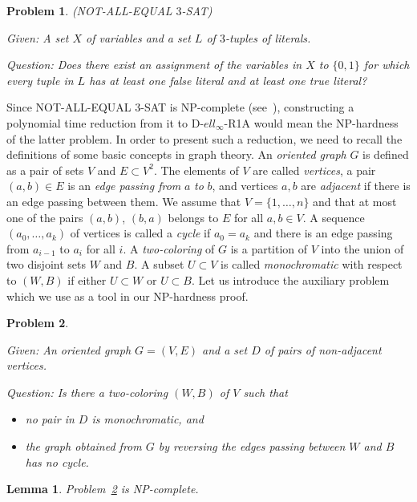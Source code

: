\documentclass[a4paper,11pt]{article}
\newtheorem{lemma}{Lemma}
\newtheorem{problem}{Problem}
\numberwithin{equation}{section}
\begin{document}
\begin{problem}\label{prob12} (NOT-ALL-EQUAL $3$-SAT) 

\noindent Given: A set $X$ of variables and a set $L$ of $3$-tuples of literals.

\noindent Question: Does there exist an assignment of the variables in $X$ to $\{0,1\}$ for which every tuple in $L$ has at least one false literal and at least one true literal? 
\end{problem} 

Since NOT-ALL-EQUAL $3$-SAT is NP-complete (see~\cite{Karp}), constructing a polynomial time reduction from it to D-$ell_\infty$-R1A would mean the NP-hardness of the latter problem. In order to present such a reduction, we need to recall the definitions of some basic concepts in graph theory. An \textit{oriented graph} $G$ is defined as a pair of sets $V$ and $E\subset V^2$. The elements of $V$ are called \textit{vertices}, a pair $(a,b)\in E$ is an \textit{edge passing from} $a$ \textit{to} $b$, and vertices $a,b$ are \textit{adjacent} if there is an edge passing between them. We assume that $V=\{1,\ldots,n\}$ and that at most one of the pairs $(a,b)$, $(b,a)$ belongs to $E$ for all $a,b \in V$. 
A sequence $(a_0,\ldots,a_k)$ of vertices is called a \textit{cycle} if $a_0=a_k$ and there is an edge passing from $a_{i-1}$ to $a_i$ for all $i$. 
A \textit{two-coloring} of $G$ is a partition of $V$ into the union of two disjoint sets $W$ and $B$. A subset $U\subset V$ is called \textit{monochromatic} with respect to $(W,B)$ if either $U\subset W$ or $U\subset B$. Let us introduce the auxiliary problem which we use as a tool in our NP-hardness proof.

\begin{problem} \label{probgraph} \hspace{0.1cm} \,  

\noindent Given: An oriented graph $G=(V,E)$ and a set $D$ of pairs of non-adjacent vertices.

\noindent Question: Is there a two-coloring $(W,B)$ of $V$ such that 
\begin{itemize}
\item[(i)]  no pair in $D$ is monochromatic, and 
\item[(ii)] the graph obtained from $G$ by reversing the edges passing between $W$ and $B$ has no cycle. 
\end{itemize}
\end{problem}

\begin{lemma}\label{lemgraph}
Problem~\ref{probgraph} is NP-complete.
\end{lemma}
\end{document}
